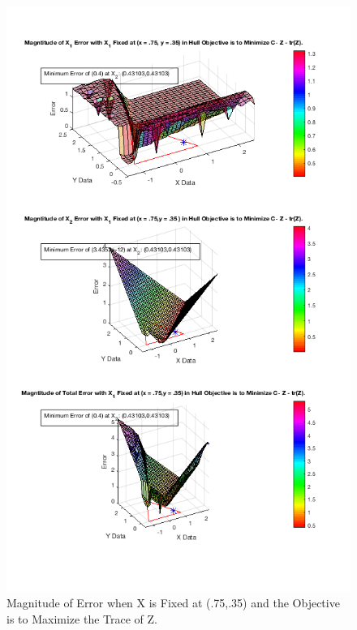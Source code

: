 \documentclass[answers]{exam}
\begin{document}
        \begin{figure}[H]
    \centering
    
        \caption{Magnitude of Error when X is Fixed at (.75,.35) and the Objective is to Maximize the Trace of Z.}
    \includegraphics[scale=.7]{Problem8f4.png}
    \end{figure} 
    
\end{document}
